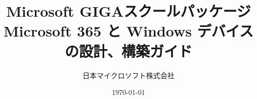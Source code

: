 \documentclass[a4paper,10pt]{jsbook}
\begin{document}
\title{\large Microsoft GIGAスクールパッケージ\\ \LARGE Microsoft 365 と Windows デバイスの設計、構築ガイド}
\date{\today}
\author{日本マイクロソフト株式会社}
\maketitle
\newpage

\newpage
\tableofcontents
\newpage






%
\end{document}
